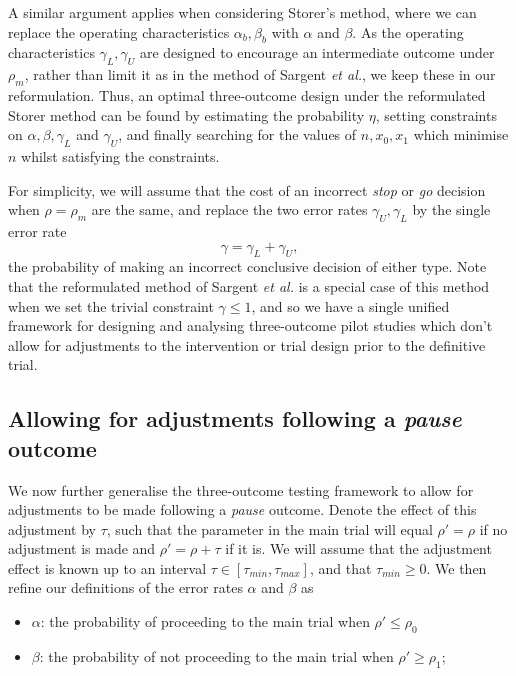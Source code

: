 \documentclass[referee, lineno, pdflatex,sn-vancouver,Numbered]{sn-jnl}%
\theoremstyle{thmstyleone}%
\theoremstyle{thmstyletwo}%
\theoremstyle{thmstylethree}%
\begin{document}
A similar argument applies when considering Storer's method, where we can replace the operating characteristics $\alpha_b, \beta_b$ with $\alpha$ and $\beta$. As the operating characteristics $\gamma_L, \gamma_U$ are designed to encourage an intermediate outcome under $\rho_m$, rather than limit it as in the method of Sargent \emph{et al.}, we keep these in our reformulation. Thus, an optimal three-outcome design under the reformulated Storer method can be found by estimating the probability $\eta$, setting constraints on $\alpha, \beta, \gamma_L$ and $\gamma_U$, and finally searching for the values of  $n, x_0, x_1$ which minimise $n$ whilst satisfying the constraints. 

For simplicity, we will assume that the cost of an incorrect \emph{stop} or \emph{go} decision when $\rho = \rho_m$ are the same, and replace the two error rates $\gamma_U, \gamma_L$ by the single error rate
\begin{equation*}
\gamma = \gamma_L + \gamma_U,
\end{equation*}
the probability of making an incorrect conclusive decision of either type. Note that the reformulated method of Sargent \emph{et al.} is a special case of this method when we set the trivial constraint $\gamma \leq 1$, and so we have a single unified framework for designing and analysing three-outcome pilot studies which don't allow for adjustments to the intervention or trial design prior to the definitive trial.

\subsection{Allowing for adjustments following a \emph{pause} outcome}\label{sec:adjustments}

We now further generalise the three-outcome testing framework to allow for adjustments to be made following a \emph{pause} outcome. Denote the effect of this adjustment by $\tau$, such that the parameter in the main trial will equal $\rho' = \rho$ if no adjustment is made and $\rho' = \rho + \tau$ if it is. We will assume that the adjustment effect is known up to an interval $\tau \in [\tau_{min}, \tau_{max}]$, and that $\tau_{min} \geq 0$. We then refine our definitions of the error rates $\alpha$ and $\beta$ as

\begin{itemize}
\item $\alpha$: the probability of proceeding to the main trial when $\rho' \leq \rho_0$
\item $\beta$: the probability of not proceeding to the main trial when $\rho' \geq \rho_1$;
\end{itemize}
\end{document}
